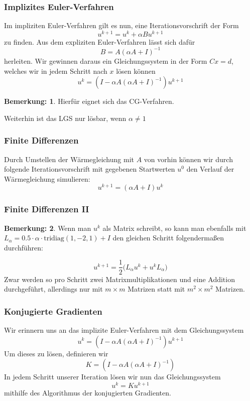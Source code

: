 \documentclass[xcolor = dvipsnames, notheorems, 10pt]{beamer}
\newcommand{\vth}{\vspace{4pt}}
\theoremstyle{definition}
\newtheorem{remark}		{Bemerkung:\vth}
\begin{document}
\begin{frame}
\frametitle{Implizites Euler-Verfahren}
	Im impliziten Euler-Verfahren gilt es nun, eine Iterationsvorschrift der Form
	$$ u^{k+1} = u^k + \alpha Bu^{k+1} $$
	zu finden.
	Aus dem expliziten Euler-Verfahren lässt sich dafür
	$$ B = A (\alpha A + I)^{-1} $$
	herleiten.
	Wir gewinnen daraus ein Gleichungssystem in der Form $Cx = d$, welches wir in jedem Schritt nach $x$ lösen können
	$$ u^k = (I - \alpha A (\alpha A + I)^{-1}) u^{k+1} $$
	\begin{remark}
		Hierfür eignet sich das CG-Verfahren.

		Weiterhin ist das LGS nur lösbar, wenn $\alpha \neq 1$
	\end{remark}

\end{frame}

\begin{frame}
\frametitle{Finite Differenzen}
	Durch Umstellen der Wärmegleichung mit $A$ von vorhin können wir durch folgende Iterationsvorschrift mit gegebenen Startwerten $u^0$ den Verlauf der Wärmegleichung simulieren:
	$$u^{k+1} = (\alpha A+I)u^k$$
\end{frame}

\begin{frame}
\frametitle{Finite Differenzen II}
	\begin{remark}
		Wenn man $u^k$ als Matrix schreibt, so kann man ebenfalls mit $L_\alpha = 0.5 \cdot \alpha \cdot \text{tridiag}(1,-2,1) + I$ den gleichen Schritt folgendermaßen durchführen:

		$$u^{k+1} = \frac{1}{2} \big( L_\alpha u^k + u^kL_\alpha \big)$$
		Zwar werden so pro Schritt zwei Matrixmultiplikationen und eine Addition durchgeführt, allerdings nur mit $m \times m$ Matrizen statt mit $m^2 \times m^2$ Matrizen.
	\end{remark}
\end{frame}


\begin{frame}
\frametitle{Konjugierte Gradienten}
	Wir erinnern uns an das implizite Euler-Verfahren mit dem Gleichungssystem 
		$$ u^k = (I - \alpha A (\alpha A + I)^{-1}) u^{k+1} $$
	Um dieses zu lösen, definieren wir 
		$$ K = (I - \alpha A (\alpha A + I)^{-1})$$
	In jedem Schritt unserer Iteration lösen wir nun das Gleichungssystem
		$$ u^k = Ku^{k+1}$$
	mithilfe des Algorithmus der konjugierten Gradienten.

\end{frame}
\end{document}
